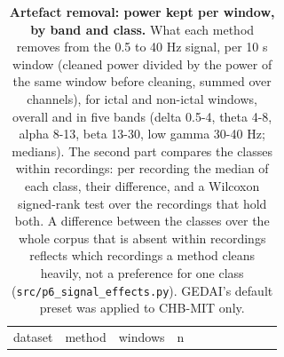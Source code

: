 \documentclass[11pt,a4paper]{article}
\begin{document}
\endgroup

\begingroup\footnotesize\setlength{\tabcolsep}{3pt}

\begin{longtable}[]{@{}
  >{\raggedright\arraybackslash}p{}
  >{\raggedright\arraybackslash}p{}
  >{\raggedright\arraybackslash}p{}
  >{\raggedright\arraybackslash}p{}
  >{\raggedright\arraybackslash}p{}
  >{\raggedright\arraybackslash}p{}
  >{\raggedright\arraybackslash}p{}
  >{\raggedright\arraybackslash}p{}
  >{\raggedright\arraybackslash}p{}
  >{\raggedright\arraybackslash}p{}
  >{\raggedright\arraybackslash}p{}@{}}
\caption{\textbf{Artefact removal: power kept per window, by band and class.} What each method removes from the 0.5 to 40 Hz signal, per 10 s window (cleaned power divided by the power of the same window before cleaning, summed over channels), for ictal and non-ictal windows, overall and in five bands (delta 0.5-4, theta 4-8, alpha 8-13, beta 13-30, low gamma 30-40 Hz; medians). The second part compares the classes within recordings: per recording the median of each class, their difference, and a Wilcoxon signed-rank test over the recordings that hold both. A difference between the classes over the whole corpus that is absent within recordings reflects which recordings a method cleans heavily, not a preference for one class (\nolinkurl{src/p6_signal_effects.py}). GEDAI's default preset was applied to CHB-MIT only.}\tabularnewline
\toprule\noalign{}
\begin{minipage}[b]{\linewidth}\raggedright
dataset
\end{minipage} & \begin{minipage}[b]{\linewidth}\raggedright
method
\end{minipage} & \begin{minipage}[b]{\linewidth}\raggedright
windows
\end{minipage} & \begin{minipage}[b]{\linewidth}\raggedright
n
\end{minipage} & \begin{minipage}[b]{\linewidth}\raggedright

\end{minipage}
\end{longtable}
\end{document}
